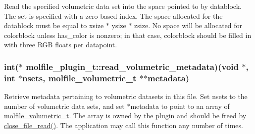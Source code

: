 \-Read the specified volumetric data set into the space pointed to by datablock. \-The set is specified with a zero-\/based index. \-The space allocated for the datablock must be equal to xsize $\ast$ ysize $\ast$ zsize. \-No space will be allocated for colorblock unless has\-\_\-color is nonzero; in that case, colorblock should be filled in with three \-R\-G\-B floats per datapoint. \hypertarget{structmolfile__plugin__t_ac54290d6b607ba8b1fd9e38a1e7f69a1}{
\subsubsection[{read\-\_\-volumetric\-\_\-metadata}]{\setlength{\rightskip}{0pt plus 5cm}int($\ast$  {\bf molfile\-\_\-plugin\-\_\-t\-::read\-\_\-volumetric\-\_\-metadata})({\bf void} $\ast$, int $\ast$nsets, {\bf molfile\-\_\-volumetric\-\_\-t} $\ast$$\ast$metadata)}}\label{structmolfile__plugin__t_ac54290d6b607ba8b1fd9e38a1e7f69a1}
\-Retrieve metadata pertaining to volumetric datasets in this file. \-Set nsets to the number of volumetric data sets, and set $\ast$metadata to point to an array of \hyperlink{structmolfile__volumetric__t}{molfile\-\_\-volumetric\-\_\-t}. \-The array is owned by the plugin and should be freed by \hyperlink{structmolfile__plugin__t_a2fbc2c1623f4453c8bd95548e6c5de53}{close\-\_\-file\-\_\-read()}. \-The application may call this function any number of times. \hypertarget{structmolfile__plugin__t_a0aad2280e74ace06633058e3501a340b}{
\subsubsection[{vmdplugin\-\_\-\-H\-E\-A\-D}]{}}\label{structmolfile__plugin__t_a0aad2280e74ace06633058e3501a340b}
